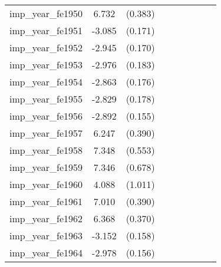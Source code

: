 {\begin{tabular}{l*{4}{cc}}
imp\_year\_fe1950&    6.732\sym{***}&  (0.383)&                  &         &                  &         &                  &         \\
imp\_year\_fe1951&   -3.085\sym{***}&  (0.171)&                  &         &                  &         &                  &         \\
imp\_year\_fe1952&   -2.945\sym{***}&  (0.170)&                  &         &                  &         &                  &         \\
imp\_year\_fe1953&   -2.976\sym{***}&  (0.183)&                  &         &                  &         &                  &         \\
imp\_year\_fe1954&   -2.863\sym{***}&  (0.176)&                  &         &                  &         &                  &         \\
imp\_year\_fe1955&   -2.829\sym{***}&  (0.178)&                  &         &                  &         &                  &         \\
imp\_year\_fe1956&   -2.892\sym{***}&  (0.155)&                  &         &                  &         &                  &         \\
imp\_year\_fe1957&    6.247\sym{***}&  (0.390)&                  &         &                  &         &                  &         \\
imp\_year\_fe1958&    7.348\sym{***}&  (0.553)&                  &         &                  &         &                  &         \\
imp\_year\_fe1959&    7.346\sym{***}&  (0.678)&                  &         &                  &         &                  &         \\
imp\_year\_fe1960&    4.088\sym{***}&  (1.011)&                  &         &                  &         &                  &         \\
imp\_year\_fe1961&    7.010\sym{***}&  (0.390)&                  &         &                  &         &                  &         \\
imp\_year\_fe1962&    6.368\sym{***}&  (0.370)&                  &         &                  &         &                  &         \\
imp\_year\_fe1963&   -3.152\sym{***}&  (0.158)&                  &         &                  &         &                  &         \\
imp\_year\_fe1964&   -2.978\sym{***}&  (0.156)&                  &         &                  &         &                  &         \\

\end{tabular}}
